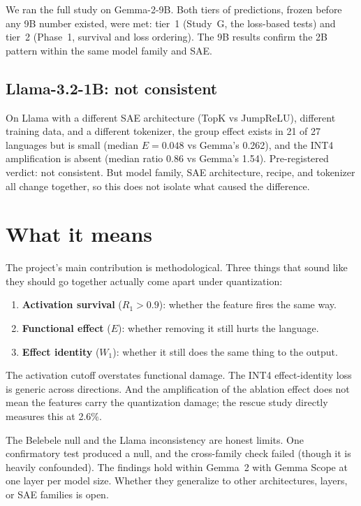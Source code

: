\documentclass[11pt]{article}
\begin{document}
We ran the full study on Gemma-2-9B. Both tiers of predictions, frozen before any 9B number existed, were met: tier~1 (Study~G, the loss-based tests) and tier~2 (Phase~1, survival and loss ordering). The 9B results confirm the 2B pattern within the same model family and SAE.

\subsection{Llama-3.2-1B: not consistent}

On Llama with a different SAE architecture (TopK vs JumpReLU), different training data, and a different tokenizer, the group effect exists in 21 of 27 languages but is small (median $E = 0.048$ vs Gemma's 0.262), and the INT4 amplification is absent (median ratio 0.86 vs Gemma's 1.54). Pre-registered verdict: not consistent. But model family, SAE architecture, recipe, and tokenizer all change together, so this does not isolate what caused the difference.

\section{What it means}

The project's main contribution is methodological. Three things that sound like they should go together actually come apart under quantization:

\begin{enumerate}
\item \textbf{Activation survival} ($R_1 > 0.9$): whether the feature fires the same way.
\item \textbf{Functional effect} ($E$): whether removing it still hurts the language.
\item \textbf{Effect identity} ($W_1$): whether it still does the same thing to the output.
\end{enumerate}

The activation cutoff overstates functional damage. The INT4 effect-identity loss is generic across directions. And the amplification of the ablation effect does not mean the features carry the quantization damage; the rescue study directly measures this at 2.6\%.

The Belebele null and the Llama inconsistency are honest limits. One confirmatory test produced a null, and the cross-family check failed (though it is heavily confounded). The findings hold within Gemma~2 with Gemma Scope at one layer per model size. Whether they generalize to other architectures, layers, or SAE families is open.
\end{document}
